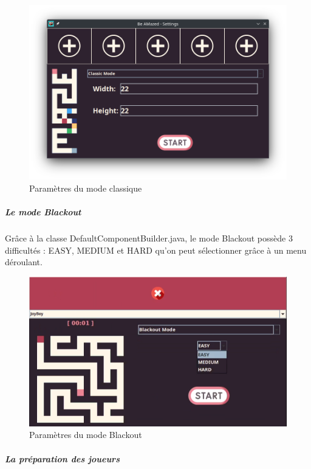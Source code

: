 \begin{figure}
    \centering
    \includegraphics[scale=0.5]{ressources/Implementation/Labyrinthe/Controleur/SettingsMenu_ClassicMode.png}
    \caption{Paramètres du mode classique}
    \label{fig:ClassicMode}
\end{figure}

\subparagraph*{Le mode Blackout}

Grâce à la classe DefaultComponentBuilder.java, le mode Blackout possède 3 difficultés : EASY, MEDIUM et HARD qu'on peut sélectionner grâce à un menu déroulant.

\begin{figure}
    \centering
    \includegraphics[scale=0.5]{ressources/Implementation/Labyrinthe/Controleur/SettingsMenu_BlackoutMode_Difficulty.png}
    \caption{Paramètres du mode Blackout}
    \label{fig:BlackoutModeDifficulty}
\end{figure}

\subparagraph*{La préparation des joueurs}

